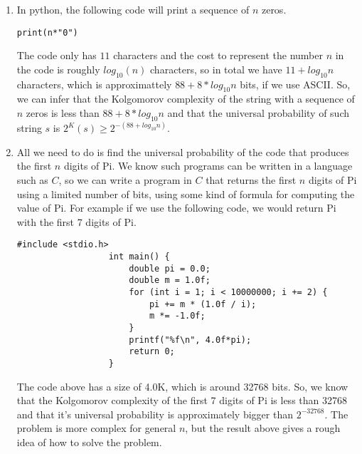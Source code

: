 \documentclass{article}
\begin{document}
\begin{enumerate}
	      \begin{enumerate}
		      \item In python, the following code will print a sequence of \(n\) zeros.
		            \begin{lstlisting}[style=Cstyle]
				  	print(n*"0")
				  \end{lstlisting}
		            The code only has \(11\) characters and the cost to represent the number \(n\) in the code is roughly \(log_{10}(n)\) characters, so in total we have \(11 + log_{10}n\) characters, which is approximattely \(88 + 8 * log_{10}n\) bits, if we use ASCII.
		            So, we can infer that the Kolgomorov complexity of the string with a sequence of \(n\) zeros is less than \(88 + 8 * log_{10}n\) and that the universal probability of such string \(s\) is \(2^K(s) \geq 2^{-(88 + log_{10}n)}\).
		      \item All we need to do is find the universal probability of the code that produces the first \(n\) digits of Pi. We know such programs can be written in a language such as \(C\), so we can write a program in \(C\) that returns the first \(n\) digits of Pi using a limited number of bits, using some kind of formula for computing
		            the value of Pi. For example if we use the following code, we would return Pi with the first 7 digits of Pi.
		            \begin{lstlisting}[style=CStyle]
				  #include <stdio.h>
				  int main() {
					  double pi = 0.0;
					  double m = 1.0f;
					  for (int i = 1; i < 10000000; i += 2) {
						  pi += m * (1.0f / i);
						  m *= -1.0f;
					  }
					  printf("%f\n", 4.0f*pi);
					  return 0;
				  }
				  \end{lstlisting}
		            The code above has a size of 4.0K, which is around 32768 bits. So, we know that the Kolgomorov complexity of the first 7 digits of Pi is less than 32768 and that it's universal probability is approximately bigger than \(2^{-32768}\).
		            The problem is more complex for general \(n\), but the result above gives a rough idea of how to solve the problem.
	      \end{enumerate}
\end{enumerate}


\nocite{*}
\end{document}
